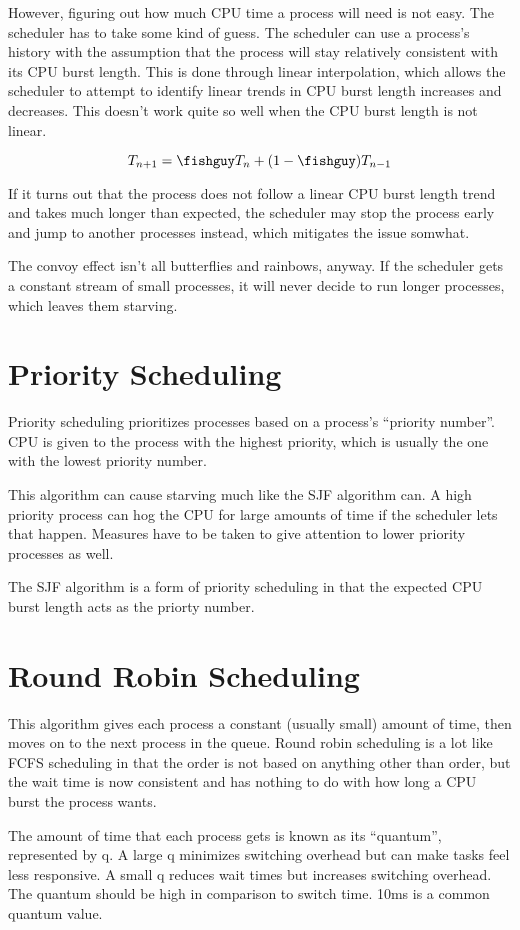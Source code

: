 \documentclass{article}
\begin{document}
However, figuring out how much CPU time a process will need is not easy. The
scheduler has to take some kind of guess. The scheduler can use a process's
history with the assumption that the process will stay relatively consistent
with its CPU burst length. This is done through linear interpolation, which
allows the scheduler to attempt to identify linear trends in CPU burst length
increases and decreases. This doesn't work quite so well when the CPU burst
length is not linear.

$$T_{n+1} = \fishguy T_n + (1 - \fishguy) T_{n-1}$$

If it turns out that the process does not follow a linear CPU burst length
trend and takes much longer than expected, the scheduler may stop the process
early and jump to another processes instead, which mitigates the issue somwhat.

The convoy effect isn't all butterflies and rainbows, anyway. If the scheduler
gets a constant stream of small processes, it will never decide to run longer
processes, which leaves them starving.

\section{Priority Scheduling}
Priority scheduling prioritizes processes based on a process's ``priority
number''. CPU is given to the process with the highest priority, which is
usually the one with the lowest priority number.

This algorithm can cause starving much like the SJF algorithm can. A high
priority process can hog the CPU for large amounts of time if the scheduler
lets that happen. Measures have to be taken to give attention to lower priority
processes as well.

The SJF algorithm is a form of priority scheduling in that the expected CPU
burst length acts as the priorty number.

\section{Round Robin Scheduling}
This algorithm gives each process a constant (usually small) amount of time,
then moves on to the next process in the queue. Round robin scheduling is a lot
like FCFS scheduling in that the order is not based on anything other than
order, but the wait time is now consistent and has nothing to do with how long
a CPU burst the process wants.

The amount of time that each process gets is known as its ``quantum'',
represented by q. A large q minimizes switching overhead but can make tasks
feel less responsive. A small q reduces wait times but increases switching
overhead. The quantum should be high in comparison to switch time. 10ms is a
common quantum value.
\end{document}
